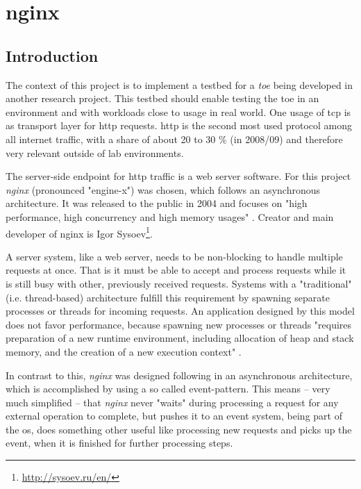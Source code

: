 \chapter{nginx}
\label{ch:nginx}

\section{Introduction}

The context of this project is to implement a testbed for a \textit{\gls{toe}} being developed in another research project. This testbed should enable testing the \gls{toe} in an environment and with workloads close to usage in real world. One usage of \gls{tcp} is as transport layer for \gls{http} requests. \gls{http} is the second most used protocol among all internet traffic, with a share of about 20 to 30 \% (in 2008/09) \cite{internet_study} and therefore very relevant outside of lab environments. 

The server-side endpoint for \gls{http} traffic is a web server software. For this project \textit{nginx} (pronounced "engine-x") was chosen, which follows an asynchronous architecture. It was released to the public in 2004 and focuses on "high performance, high concurrency and high memory usages" \cite{aosa}. Creator and main developer of nginx is Igor Sysoev\footnote{\url{http://sysoev.ru/en/}}.

A server system, like a web server, needs to be non-blocking to handle multiple requests at once. That is it must be able to accept and process requests while it is still busy with other, previously received requests. Systems with a "traditional" (i.e. thread-based) architecture fulfill this requirement by spawning separate processes or threads for incoming requests. An application designed by this model does not favor performance, because spawning new processes or threads "requires preparation of a new runtime environment, including allocation of heap and stack memory, and the creation of a new execution context" \cite{aosa}.

In contrast to this, \textit{nginx} was designed following in an asynchronous architecture, which is accomplished by using a so called event-pattern. This means -- very much simplified -- that \textit{nginx} never "waits" during processing a request for any external operation to complete, but pushes it to an event system, being part of the \gls{os}, does something other useful like processing new requests and picks up the event, when it is finished for further processing steps.

